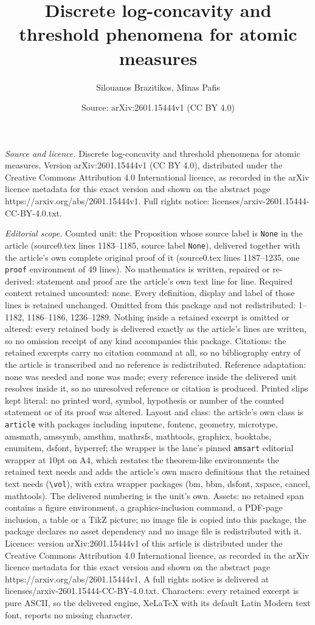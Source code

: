 \documentclass[10pt,a4paper]{amsart}
\title[Discrete log-concavity and threshold phenomena for atomic me]{Discrete log-concavity and threshold phenomena for atomic measures}
\author{Silouanos Brazitikos, Minas Pafis}
\date{Source: arXiv:2601.15444v1 (CC BY 4.0)}
\begin{document}
\maketitle

\noindent\emph{Source and licence.} Discrete log-concavity and threshold phenomena for atomic measures. Version arXiv:2601.15444v1 (CC BY 4.0), distributed under the Creative Commons Attribution 4.0 International licence, as recorded in the arXiv licence metadata for this exact version and shown on the abstract page https://arxiv.org/abs/2601.15444v1. Full rights notice: licenses/arxiv-2601.15444-CC-BY-4.0.txt.\par\smallskip

\noindent\textit{Editorial scope.} Counted unit: the Proposition whose source label is \texttt{None} in the article (source0.tex lines 1183--1185, source label \texttt{None}), delivered together with the article's own complete original proof of it (source0.tex lines 1187--1235, one \texttt{proof} environment of 49 lines). No mathematics is written, repaired or re-derived: statement and proof are the article's own text line for line. Required context retained uncounted: none. Every definition, display and label of those lines is retained unchanged. Omitted from this package and not redistributed: 1--1182, 1186--1186, 1236--1289. Nothing inside a retained excerpt is omitted or altered: every retained body is delivered exactly as the article's lines are written, so no omission receipt of any kind accompanies this package. Citations: the retained excerpts carry no citation command at all, so no bibliography entry of the article is transcribed and no reference is redistributed. Reference adaptation: none was needed and none was made; every reference inside the delivered unit resolves inside it, so no unresolved reference or citation is produced. Printed slips kept literal: no printed word, symbol, hypothesis or number of the counted statement or of its proof was altered. Layout and class: the article's own class is \texttt{article} with packages including inputenc, fontenc, geometry, microtype, amsmath, amssymb, amsthm, mathrsfs, mathtools, graphicx, booktabs, enumitem, dsfont, hyperref; the wrapper is the lane's pinned \texttt{amsart} editorial wrapper at 10pt on A4, which restates the theorem-like environments the retained text needs and adds the article's own macro definitions that the retained text needs (\texttt{\textbackslash vol}), with extra wrapper packages (bm, bbm, dsfont, xspace, cancel, mathtools). The delivered numbering is the unit's own. Assets: no retained span contains a figure environment, a graphics-inclusion command, a PDF-page inclusion, a table or a TikZ picture; no image file is copied into this package, the package declares no asset dependency and no image file is redistributed with it. Licence: version arXiv:2601.15444v1 of this article is distributed under the Creative Commons Attribution 4.0 International licence, as recorded in the arXiv licence metadata for this exact version and shown on the abstract page https://arxiv.org/abs/2601.15444v1. A full rights notice is delivered at licenses/arxiv-2601.15444-CC-BY-4.0.txt. Characters: every retained excerpt is pure ASCII, so the delivered engine, XeLaTeX with its default Latin Modern text font, reports no missing character.
\end{document}
